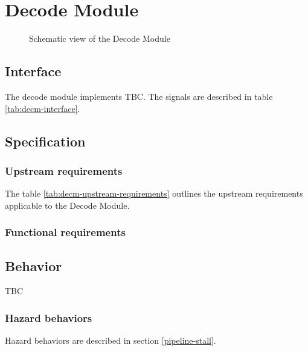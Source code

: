 \section{Decode Module}

  \begin{figure}[h!]
      \centering
      
      \caption{Schematic view of the Decode Module}
      \label{fig:decm}
    \end{figure}

  \subsection{Interface}

    \begin{content}
        The decode module implements TBC. The signals are described in table \ref{tab:decm-interface}. 
      \end{content}

    

  \subsection{Specification}

    \subsubsection{Upstream requirements}

      The table \ref{tab:decm-upstream-requirements} outlines the upstream requirements applicable to the Decode Module.

      

    \subsubsection{Functional requirements}

  \subsection{Behavior}

    \begin{content}
        TBC
      \end{content}

    \subsubsection{Hazard behaviors}

      \begin{content}
          Hazard behaviors are described in section \ref{pipeline-stall}.
        \end{content}

\newpage
